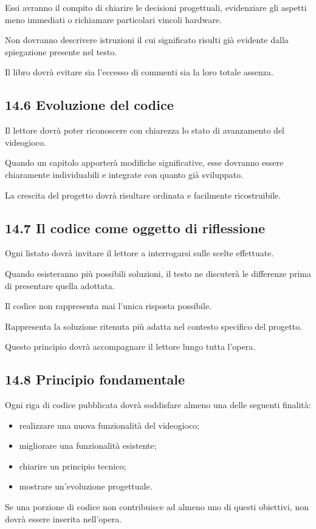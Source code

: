 \documentclass{article}
\begin{document}
Essi avranno il compito di chiarire le decisioni progettuali, evidenziare gli aspetti meno immediati o richiamare
particolari vincoli hardware.

Non dovranno descrivere istruzioni il cui significato risulti già evidente dalla spiegazione presente nel testo.

Il libro dovrà evitare sia l'eccesso di commenti sia la loro totale assenza.

\subsection{14.6 Evoluzione del codice}
Il lettore dovrà poter riconoscere con chiarezza lo stato di avanzamento del videogioco.

Quando un capitolo apporterà modifiche significative, esse dovranno essere chiaramente individuabili e integrate con
quanto già sviluppato.

La crescita del progetto dovrà risultare ordinata e facilmente ricostruibile.

\subsection{14.7 Il codice come oggetto di riflessione}
Ogni listato dovrà invitare il lettore a interrogarsi sulle scelte effettuate.

Quando esisteranno più possibili soluzioni, il testo ne discuterà le differenze prima di presentare quella adottata.

Il codice non rappresenta mai l'unica risposta possibile.

Rappresenta la soluzione ritenuta più adatta nel contesto specifico del progetto.

Questo principio dovrà accompagnare il lettore lungo tutta l'opera.

\subsection{14.8 Principio fondamentale}
Ogni riga di codice pubblicata dovrà soddisfare almeno una delle seguenti finalità:

\begin{itemize}
\item realizzare una nuova funzionalità del videogioco;
\item migliorare una funzionalità esistente;
\item chiarire un principio tecnico;
\item mostrare un'evoluzione progettuale.
\end{itemize}
Se una porzione di codice non contribuisce ad almeno uno di questi obiettivi, non dovrà essere inserita nell'opera.
\end{document}
